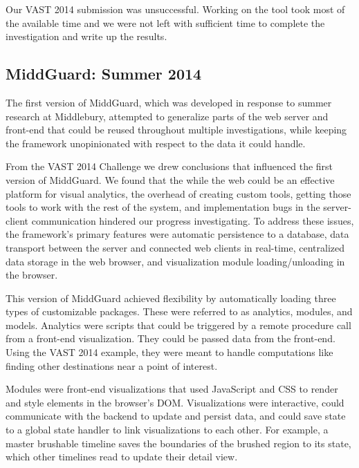 \documentclass[midd]{thesis}
\begin{document}
Our VAST 2014 submission was unsuccessful. Working on the tool took most of the
available time and we were not left with sufficient time to complete the
investigation and write up the results.

\subsection{MiddGuard: Summer 2014}

The first version of MiddGuard, which was developed in response to summer
research at Middlebury, attempted to generalize parts of the web server and
front-end that could be reused throughout multiple investigations, while keeping
the framework unopinionated with respect to the data it could handle.

From the VAST 2014 Challenge we drew conclusions that influenced the first
version of MiddGuard. We found that the while the web could be an effective
platform for visual analytics, the overhead of creating custom tools, getting
those tools to work with the rest of the system, and implementation bugs in the
server-client communication hindered our progress investigating. To address
these issues, the framework's primary features were automatic persistence to a
database, data transport between the server and connected web clients in
real-time, centralized data storage in the web browser, and visualization module
loading/unloading in the browser.

This version of MiddGuard achieved flexibility by automatically loading three
types of customizable packages. These were referred to as analytics, modules,
and models. Analytics were scripts that could be triggered by a remote procedure
call from a front-end visualization. They could be passed data from the
front-end. Using the VAST 2014 example, they were meant to handle computations
like finding other destinations near a point of interest.

Modules were front-end visualizations that used JavaScript and CSS to render and
style elements in the browser's DOM. Visualizations were interactive, could
communicate with the backend to update and persist data, and could save state to
a global state handler to link visualizations to each other. For example, a
master brushable timeline saves the boundaries of the brushed region to its
state, which other timelines read to update their detail view.
\end{document}
